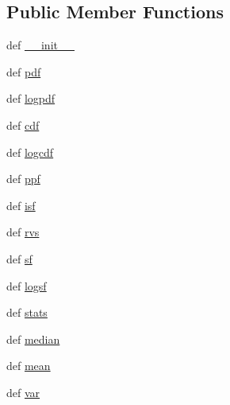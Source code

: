 \subsection*{Public Member Functions}
\begin{DoxyCompactItemize}
\item 
def \hyperlink{classscipy_1_1stats_1_1__distn__infrastructure_1_1rv__frozen_a1cb1259dd0492ad6472cf73c44f98dbc}{\+\_\+\+\_\+init\+\_\+\+\_\+}
\item 
def \hyperlink{classscipy_1_1stats_1_1__distn__infrastructure_1_1rv__frozen_aa66ef7183f26af859a87080d12a42fc2}{pdf}
\item 
def \hyperlink{classscipy_1_1stats_1_1__distn__infrastructure_1_1rv__frozen_a645d8d3703aee239b6465da3d0e708ca}{logpdf}
\item 
def \hyperlink{classscipy_1_1stats_1_1__distn__infrastructure_1_1rv__frozen_a2773cb3975576eac8aed4046e3e382e9}{cdf}
\item 
def \hyperlink{classscipy_1_1stats_1_1__distn__infrastructure_1_1rv__frozen_adff501c550a158803435709aec14c9b9}{logcdf}
\item 
def \hyperlink{classscipy_1_1stats_1_1__distn__infrastructure_1_1rv__frozen_aaf05b3471423705ab1a4143738be1229}{ppf}
\item 
def \hyperlink{classscipy_1_1stats_1_1__distn__infrastructure_1_1rv__frozen_a7a6441fcefa7742b2bed2f545c93a2a0}{isf}
\item 
def \hyperlink{classscipy_1_1stats_1_1__distn__infrastructure_1_1rv__frozen_a9e3533ec0b603e76764eabc8e6b035ab}{rvs}
\item 
def \hyperlink{classscipy_1_1stats_1_1__distn__infrastructure_1_1rv__frozen_aa7942ec39c408c95bc6c333f673c402b}{sf}
\item 
def \hyperlink{classscipy_1_1stats_1_1__distn__infrastructure_1_1rv__frozen_a723db026990cddf2f583c5e35f8d0518}{logsf}
\item 
def \hyperlink{classscipy_1_1stats_1_1__distn__infrastructure_1_1rv__frozen_ae7bb0b4835dc121626a1705e579a07e0}{stats}
\item 
def \hyperlink{classscipy_1_1stats_1_1__distn__infrastructure_1_1rv__frozen_a4d028f80deefc1eb696ad9491a1345c5}{median}
\item 
def \hyperlink{classscipy_1_1stats_1_1__distn__infrastructure_1_1rv__frozen_a9ad2e7ff7b511ff8068a1f95bb0c93a8}{mean}
\item 
def \hyperlink{classscipy_1_1stats_1_1__distn__infrastructure_1_1rv__frozen_af80fdf7fd4fa30bd2c059b5eaad8272c}{var}
\item 

\end{DoxyCompactItemize}
